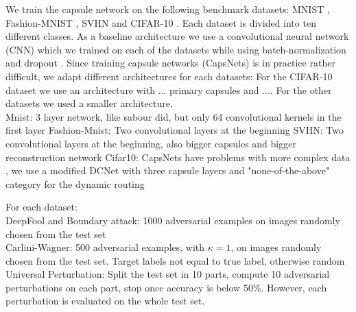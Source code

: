 \documentclass{article}
\begin{document}
We train the capsule network on the following benchmark datasets: MNIST \cite{mnist}, Fashion-MNIST \cite{fashion}, SVHN \cite{svhn} and CIFAR-10 \cite{cifar}. Each dataset is divided into ten different classes. 
As a baseline architecture we use a convolutional neural network (CNN) which we trained on each of the datasets while using batch-normalization \cite{batchnorm} and dropout \cite{dropout}. Since training capsule networks (CapsNets) is in practice rather difficult, we adapt different architectures for each datasets: For the CIFAR-10 dataset we use an architecture with ... primary capsules and .... For the other datasets we used a smaller architecture.\\
Mnist: 3 layer network, like sabour \cite{capsules} did, but only 64 convolutional kernels in the first layer
Fashion-Mnist: Two convolutional layers at the beginning
SVHN: Two convolutional layers at the beginning, also bigger capsules and bigger reconstruction network
Cifar10: CapsNets have problems with more complex data \cite{complex}, we use a modified DCNet \cite{denseanddiverse} with three capsule layers and "none-of-the-above" category for the dynamic routing \cite{capsules}

For each dataset:\\
DeepFool and Boundary attack: 1000 adversarial examples on images randomly chosen from the test set\\
Carlini-Wagner: 500 adversarial examples, with $\kappa = 1$, on images randomly chosen from the test set. Target labels not equal to true label, otherwise random \\
Universal Perturbation: Split the test set in 10 parts, compute 10 adversarial perturbations on each part, stop once accuracy is below 50\%. However, each perturbation is evaluated on the whole test set.

\end{document}
